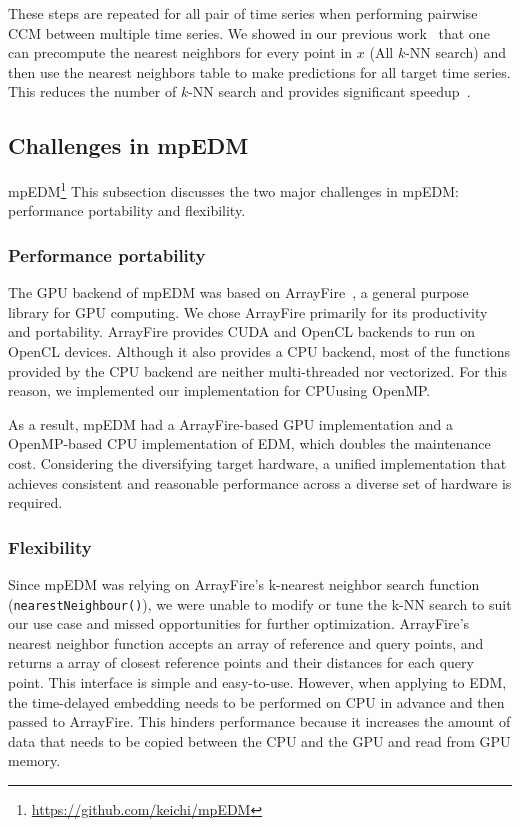 \documentclass[sigconf]{acmart}
\begin{document}
These steps are repeated for all pair of time series when performing
pairwise CCM between multiple time series. We showed in our previous
work~\cite{mpedm} that one can precompute the nearest neighbors for every
point in $x$ (All $k$-NN search) and then use the nearest neighbors table to
make predictions for all target time series. This reduces the number of $k$-NN
search and provides significant speedup~\cite{mpedm}.

\subsection{Challenges in mpEDM}\label{sec:challenges}

mpEDM\footnote{\url{https://github.com/keichi/mpEDM}}
This subsection discusses the two major challenges in mpEDM: performance
portability and flexibility.

\subsubsection{Performance portability}\label{sec:portability}

The GPU backend of mpEDM was based on ArrayFire~\cite{Malcolm2012}, a general
purpose library for GPU computing. We chose ArrayFire primarily for its
productivity and portability. ArrayFire provides CUDA and OpenCL backends to
run on OpenCL devices. Although it also provides a CPU backend, most of the
functions provided by the CPU backend are neither multi-threaded nor
vectorized. For this reason, we implemented our implementation for CPU\@ using
OpenMP\@.

As a result, mpEDM had a ArrayFire-based GPU implementation and a OpenMP-based
CPU implementation of EDM, which doubles the maintenance cost. Considering the
diversifying target hardware, a unified implementation that achieves
consistent and reasonable performance across a diverse set of hardware is
required.

\subsubsection{Flexibility}\label{sec:flexibility}

Since mpEDM was relying on ArrayFire's k-nearest neighbor search function
(\texttt{nearestNeighbour()}), we were unable to modify or tune the k-NN
search to suit our use case and missed opportunities for further optimization.
ArrayFire's nearest neighbor function accepts an array of reference and query
points, and returns a array of closest reference points and their distances
for each query point. This interface is simple and easy-to-use. However, when
applying to EDM, the time-delayed embedding needs to be performed on CPU in
advance and then passed to ArrayFire. This hinders performance because it
increases the amount of data that needs to be copied between the CPU and the
GPU and read from GPU memory.
\end{document}

